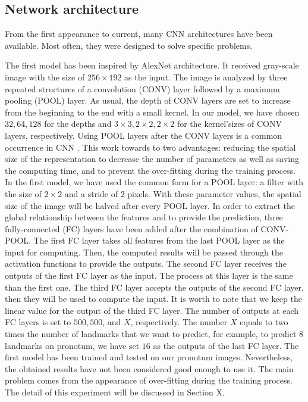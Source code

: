 \documentclass[review]{elsarticle}
\begin{document}
\subsection{Network architecture}
From the first appearance to current, many CNN architectures have been available. Most often, they were designed to solve specific problems. 

The first model has been inspired by AlexNet architecture. It received gray-scale image with the size of $256 \times 192$ as the input. The image is analyzed by three repeated structures of a convolution (CONV) layer followed by a maximum pooling (POOL) layer. As usual, the depth of CONV layers are set to increase from the beginning to the end with a small kernel. In our model, we have chosen $32, 64, 128 $ for the depths and $ 3 \times 3, 2 \times 2, 2 \times 2 $ for the kernel'sizes of CONV layers, respectively. Using POOL layers after the CONV layers is a common occurrence in CNN \cite{}. This work towards to two advantages: reducing the spatial size of the representation to decrease the number of parameters as well as saving the computing time, and to prevent the over-fitting during the training process. In the first model, we have used the common form for a POOL layer: a filter with the size of $2 \times 2$ and a stride of $2$ pixels. With these parameter values, the spatial size of the image will be halved after every POOL layer. In order to extract the global relationship between the features and to provide the prediction, three fully-connected (FC) layers have been added after the combination of CONV-POOL. The first FC layer takes all features from the last POOL layer as the input for computing. Then, the computed results will be passed through the activation functions to provide the outputs. The second FC layer receives the outputs of the first FC layer as the input. The process at this layer is the same than the first one. The third FC layer accepts the outputs of the second FC layer, then they will be used to compute the input. It is worth to note that we keep the linear value for the output of the third FC layer. The number of outputs at each FC layers is set to $500, 500$, and $X$, respectively. The number $X$ equals to two times the number of landmarks that we want to predict, for example, to predict $8$ landmarks on pronotum, we have set $16$ as the outputs of the last FC layer. The first model has been trained and tested on our pronotum images. Nevertheless, the obtained results have not been considered good enough to use it. The main problem comes from the appearance of over-fitting during the training process. The detail of this experiment will be discussed in Section X.
\end{document}
